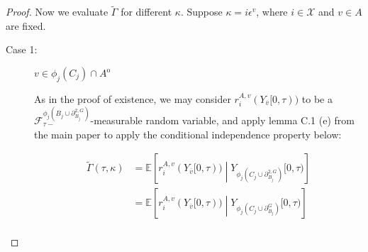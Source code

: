 \documentclass[12pt]{article}
\newcommand{\mb}{\mathbb}
\newcommand{\mc}{\mathcal}
\newcommand{\ov}{\overline}
\newcommand{\ep}{\epsilon}
\newcommand{\ex}[1]{\mb{E}\left[#1\right]}			%
\newcommand{\sta}{\mc{X}}							%
\newcommand{\gneigh}[2]{\partial^{#1}_{#2}}			%
\newcommand{\dgneigh}[2]{\partial^{2,#1}_{#2}}		%
\newcommand{\cl}[1]{\ov{#1}}						%
\newcommand{\rate}{r}								%
\newcommand{\F}{\mc{F}}								%
\newcommand{\vind}[1]{_{#1}}						%
\newcommand{\tmi}[1]{#1}							%
\newcommand{\vpara}[1]{^{#1}}						%
\newcommand{\stpara}[1]{_{#1}}						%
\newcommand{\tpara}[1]{_{#1}}						%
\newcommand{\gvpara}[2]{^{#1,#2}}					%
\newcommand{\Xg}{Y}									%
\newcommand{\inte}[1]{{#1}^\mathrm{o}}				%
\newcommand{\alt}[1]{\tilde{#1}}					%
\newcommand{\rt}{\tau}								%
\renewcommand{\mark}{\kappa}						%
\newcommand{\ratee}{\Gamma}							%
\newcommand{\cratee}{\alt{\ratee}}					%
\newcommand{\ev}[1]{\ep^{#1}}						%
\begin{document}
\begin{proof}
Now we evaluate \(\cratee\) for different \(\kappa\). Suppose \(\kappa = i\ev{v}\), where \(i \in \sta\) and \(v\in A\) are fixed.

\begin{description}
\item[Case 1: ] \(v \in \phi_j(C_j)\cap \inte{A}\)

As in the proof of existence, we may consider \(\rate\gvpara{A}{v}\stpara{i}(\Xg\vind{\cl{v}}\tmi{[0,\rt)})\) to be a \(\F\vpara{\phi_j(B_j\cup\dgneigh{G}{B_j})}\tpara{\rt-}\)-measurable random variable, and apply lemma C.1 (e) from the main paper to apply the conditional independence property below:

\begin{align*}
\cratee(\rt,\mark) &= \ex{\rate\gvpara{A}{v}\stpara{i}(\Xg\vind{\cl{v}}\tmi{[0,\rt)})\middle|\Xg\vind{\phi_j\left(C_j\cup\dgneigh{G}{B_j}\right)}\tmi{[0,\rt)}}\\
&=\ex{\rate\gvpara{A}{v}\stpara{i}(\Xg\vind{\cl{v}}\tmi{[0,\rt)})\middle|\Xg\vind{\phi_j\left(C_j\cup\gneigh{G}{B_j}\right)}\tmi{[0,\rt)}}\\
\end{align*}
\end{description}
\end{proof}




\newpage


\end{document}
